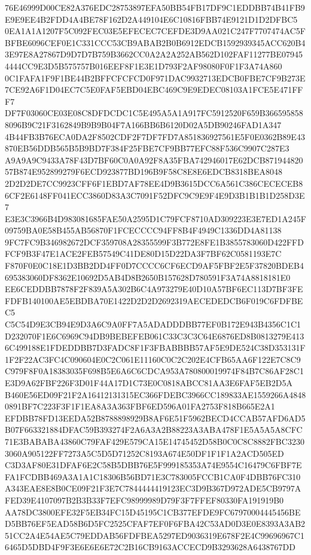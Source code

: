 \documentclass[UTF8,fontset=fandol,zihao=-4,a4paper]{ctexart}
\begin{document}
{{76E46999D00CE82A376EDC28753897EFA50BB54FB17DF9C1EDDBB74B41FB9E9E9EE4B2FDD4A4BE78F162D2A449104E6C10816FBB74E9121D1D2DFBC5
0EA1A1A1207F5C092FEC03E5EFECEC7CEFDE3D9AA021C247F7707474AC5FBFBE6096CEF0E1C331CCC53CB9ABAB2B0B6912EDCB1592939345ACC620B4
3E97E8A27867D9D7D7B759B3662CC0A2A2A252AB562D102FAF11277BE079454444CC9E3D5B575757B016EEF8F1E3E1D793F2AF98080F0F1F3A74A860
0C1FAFA1F9F1BE44B2BFFCFCFCD0F971DAC9932713EDCB0FBE7CF9B273E7CE92A6F1D04EC7C5E0FAF5EBD04EBC469C9E9EDEC08103A1FCE5E471FFF7
DF7F03060CE03E08C8DFDCDC1C5E495A5A1A917FC5912520F659B3665958588096B9C21F3162849B9B9B04F7A166BB6B6120D02A5DB90246FAD1A347
4B44FB3B76ECA0DA2F8502CDF2F7DF7FD7A851836927561E5F0E0362B89E43870EB56DDB565B5B9BD7F384F25FBE7CF9BB77EFC88F536C9907C287E3
A9A9A9C9433A78F43D7BF60C0A0A92F8A35FBA742946017E62DCB87194482057B874E952899279F6ECD923877BD196B9F58C8E8E6EDCB8318BEA8048
2D2D2DE7CC9923CFF6F1EBD7AF78EE4D9B3615DCC6A561C386CECECEB86CF2E6148FF041ECC3860D83A3C7091F52DFC9C9E9F4E9D3B1B1B1D258D3E7
E3E3C3966B4D983081685FAE50A2595D1C79FCF8710AD309223E3E7ED1A245F09759BA0E58B455AB56870F1FCECCCC94FF8B4F4949C1336DD4A81138
9FC7FC9B346982672DCF359708A28355599F3B772E8FE1B3855783060D422FFDFCF9B3F47E1ACE2FEB57549C41DE80D15D22DA3F7BF62C0581193E7C
F870F0E0C18E1D3BB2DD4FF0D7CCCC6CF6ECD9AF5FBF2E5F37820BDEB4695383060DF8362E10692D5AB4D8B2650B157628D780591F3A74A8818181E0
EE6CEDDBB7878F2F839A5A302B6C4A973279E40D10A57BF6EC113D7BF3FEFDFB140100AE5EBDBA70E1422D2D2D2692319AECEDEDCB6F019C6FDFBEC5
C5C54D9E3CB94E9D3A6C9A0FF7A5ADADDDBB77EF0B172E943B4356C1C1D232070F1E6C6969C94DB9BEBEFEB061C33C3C3C64E6876ED8B0813279E413
6C499188E1FDEDDBB7D3FADC8F1F3FBABBBB57AF5E9DE524C38D353131F1F2F22AC3FC4C090604E0C2C061E11160C0C2C202E4CFB65AA6F122E7C8C9
C979F8F0A18383035F698B5E6A6C6CDCA953A780800019974F84B7C86AF28C1E3D9A62FBF226F3D01F44A17D1C73E0C0818ABCC81AA3E6FAF5EB2D5A
B460E56ED09F21F2A16412131315EC366FDEBC3966CC189833AE1559266A48480891BF7C223F3F1F1EA8A3A363FBF6ED596A01FA2753F818B665E2A1
EFDBB78FD13EEDA52B8788898929B8AF6E51F5962BECD4CCAB57AFD6AD5B07F663321884DFAC59B393274F2A6A3A2B88223A3ABA478F1E5A5A5A8CFC
71E3BABABA43860C79FAF429E579CA15E14745452D58B0C0C8C8882FBC32303060A905122FF7273A5C5D5D71252C8193A674E50DF1F1F1A2ACD505ED
C3D3AF80E31DFAF6E2C58B5DBB76E5F999185353A74E9554C16479C6FBF7EFA1FCDBB469A3A1A1C18306B56BD71E3C783005FCCB1CA0F4DBB76FC310
A343EAE8E8B0CE09F21F3E7C7844444419123EC3D9B367D972ADE5CB9797AFED39E4107097B2B3B33F7EFC98999989D79F3F7FFEF80330FA191919B0
AA78DC3800EFE32F5EB34FC15D45195C1CB377EFDE9FC67970004445456BED5BB76EF5EAD58B6D5FC2525CFAF7EF0F6FBA42C53AD0D3E0E8393A3AB2
51CC2A4E54AE5C79EDDAB56FDFBEA5297ED9036319E678F2E4C99696967C16465D5DBD4F9F3E6E6E6E72C2B16CB9163ACCECD9B3293628A6438767DD
}}
\end{document}
